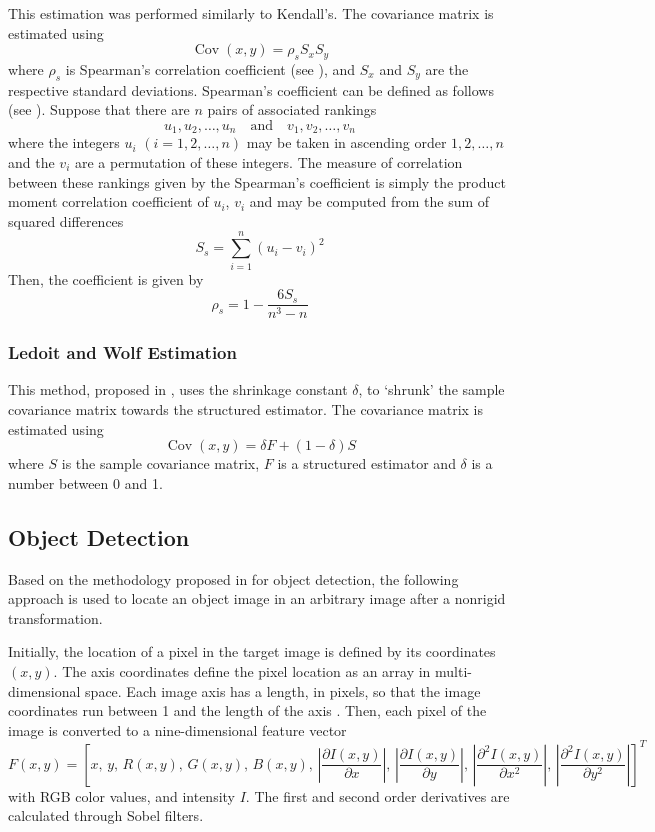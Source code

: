 \documentclass[11pt]{article}
\theoremstyle{definition}
\theoremstyle{remark}
\theoremstyle{remark}
\theoremstyle{remark}
\begin{document}
This estimation was performed similarly to Kendall's. The covariance matrix is
estimated using
%
\[
  \operatorname{Cov}(x, y)=\rho_{s} S_{x} S_{y}
\]
%
where $\rho_{s}$ is Spearman's correlation coefficient (see
\parencite{spearman1961general}), and $S_{x}$ and $S_{y}$ are the respective
standard deviations. Spearman's coefficient can be defined as follows (see
\cite{spearmscoeff}). Suppose that there are $n$ pairs of associated rankings
%
\[
u_{1}, u_{2}, \ldots, u_{n} \quad \text{and} \quad v_{1}, v_{2}, \ldots, v_{n}
\]
%
where the integers $u_{i}$ $(i = 1,2,\ldots,n)$ may be taken in ascending order
$1,2,\ldots,n$ and the $v_{i}$ are a permutation of these integers. The measure
of correlation between these rankings given by the Spearman's coefficient is
simply the product moment correlation coefficient of $u_{i}$, $v_{i}$ and may be
computed from the sum of squared differences
%
\[
  S_{s} = \sum_{i = 1}^{n} (u_{i} - v_{i})^{2}
\]
%
Then, the coefficient is given by
%
\[
\rho_{s} = 1 - \dfrac{6S_{s}}{n^{3} - n}
\]

\subsubsection{Ledoit and Wolf Estimation}

This method, proposed in \parencite{ledoit2004honey}, uses the shrinkage
constant $\delta$, to ‘shrunk’ the sample covariance matrix towards the
structured estimator. The covariance matrix is estimated using
%
\[
\operatorname{Cov}(x, y)={\delta} F+\left(1-{\delta}\right)S
\]
%
where $S$ is the sample covariance matrix, $F$ is a structured estimator and
$\delta$ is a number between 0 and 1.


\subsection{Object Detection}
Based on the methodology proposed in \parencite{tuzel2006} for object detection,
the following approach is used to locate an object image in an arbitrary image
after a nonrigid transformation.

Initially, the location of a pixel in the target image is defined by its
coordinates $(x,y)$. The axis coordinates define the pixel location as an array
in multi-dimensional space. Each image axis has a length, in pixels, so that the
image coordinates run between 1 and the length of the axis
\parencite{mikhail1984detection}. Then, each pixel of the image is converted to
a nine-dimensional feature vector
%
\begin{equation}
  F(x, y)=\left[x,\, y,\, R(x, y),\, G(x, y),\, B(x, y),\,\left|\frac{\partial I(x, y)}{\partial x}\right|,\,\left|\frac{\partial I(x, y)}{\partial y}\right|,\,\left|\frac{\partial^{2} I(x, y)}{\partial x^{2}}\right|,\,\left|\frac{\partial^{2} I(x, y)}{\partial y^{2}}\right|\right]^{T}
\end{equation}
%
with RGB color values, and intensity $I$. The first and second order derivatives
are calculated through Sobel filters.
\end{document}
